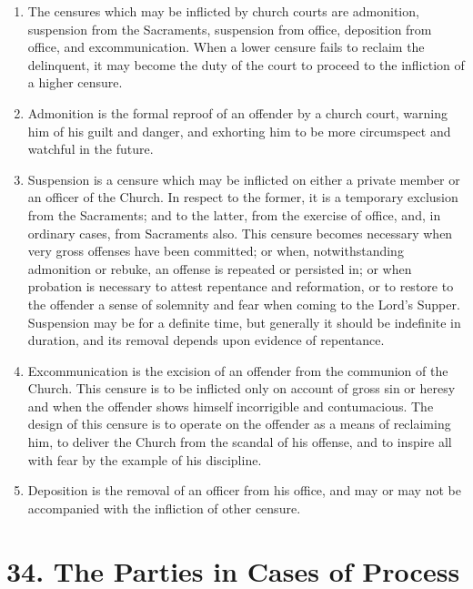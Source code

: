 \documentclass[
]{book}
\providecommand{\tightlist}{%
  \setlength{\itemsep}{0pt}\setlength{\parskip}{0pt}}
\begin{document}
\begin{enumerate}
\def\labelenumi{\arabic{enumi}.}
\tightlist
\item
  \protect\hypertarget{33}{\href{}{}}The censures which may be inflicted by church courts are admonition, suspension from the Sacraments, suspension from office, deposition from office, and excommunication. When a lower censure fails to reclaim the delinquent, it may become the duty of the court to proceed to the infliction of a higher censure.
\item
  Admonition is the formal reproof of an offender by a church court, warning him of his guilt and danger, and exhorting him to be more circumspect and watchful in the future.
\item
  Suspension is a censure which may be inflicted on either a private member or an officer of the Church. In respect to the former, it is a temporary exclusion from the Sacraments; and to the latter, from the exercise of office, and, in ordinary cases, from Sacraments also. This censure becomes necessary when very gross offenses have been committed; or when, notwithstanding admonition or rebuke, an offense is repeated or persisted in; or when probation is necessary to attest repentance and reformation, or to restore to the offender a sense of solemnity and fear when coming to the Lord's Supper. Suspension may be for a definite time, but generally it should be indefinite in duration, and its removal depends upon evidence of repentance.
\item
  Excommunication is the excision of an offender from the communion of the Church. This censure is to be inflicted only on account of gross sin or heresy and when the offender shows himself incorrigible and contumacious. The design of this censure is to operate on the offender as a means of reclaiming him, to deliver the Church from the scandal of his offense, and to inspire all with fear by the example of his discipline.
\item
  Deposition is the removal of an officer from his office, and may or may not be accompanied with the infliction of other censure.
\end{enumerate}

\hypertarget{the-parties-in-cases-of-process}{%
\section*{34. The Parties in Cases of Process}\label{the-parties-in-cases-of-process}}
\end{document}
